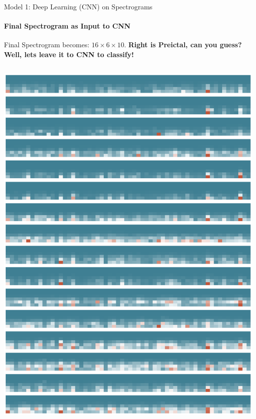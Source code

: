 \documentclass{beamer}
\begin{document}
\begin{frame}{Model 1: Deep Learning (CNN) on Spectrograms}
  \framesubtitle{Final Spectrogram as Input to CNN}

  Final Spectrogram becomes: $16 \times 6 \times 10$. \textbf{Right is Preictal,
    can you guess? Well, lets leave it to CNN to classify!}

  \begin{columns}
    \includegraphics[scale=0.22]{img/sample_spec.eps}
    


\end{columns}
\end{frame}
\end{document}
